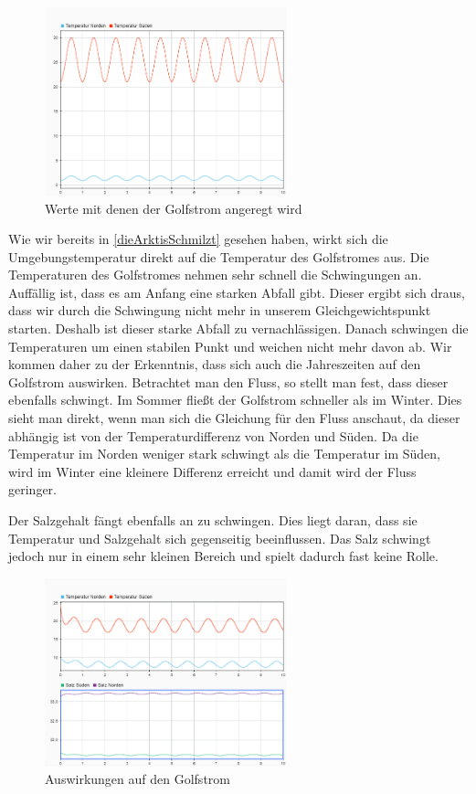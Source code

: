 \documentclass[a4paper,twoside]{article}
\begin{document}
	\begin{figure}[!h]
  		\centering
 		\includegraphics[width=7cm]{Grafiken/Jahreszeiten_init.png}
  		\caption{Werte mit denen der Golfstrom angeregt wird}
  		\label{fig:jahreszeitenUmgebung}
	\end{figure}
	
	Wie wir bereits in \ref{dieArktisSchmilzt} gesehen haben, wirkt sich die Umgebungstemperatur direkt auf die Temperatur des Golfstromes aus. Die Temperaturen des Golfstromes nehmen sehr schnell die Schwingungen an. Auffällig ist, dass es am Anfang eine starken Abfall gibt. Dieser ergibt sich draus, dass wir durch die Schwingung nicht mehr in unserem Gleichgewichtspunkt starten. Deshalb ist dieser starke Abfall zu vernachlässigen. Danach schwingen die Temperaturen um einen stabilen Punkt und weichen nicht mehr davon ab. Wir kommen daher zu der Erkenntnis, dass sich auch die Jahreszeiten auf den Golfstrom auswirken. Betrachtet man den Fluss, so stellt man fest, dass dieser ebenfalls schwingt. Im Sommer fließt der Golfstrom schneller als im Winter. Dies sieht man direkt, wenn man sich die Gleichung für den Fluss anschaut, da dieser abhängig ist von der Temperaturdifferenz von Norden und Süden. Da die Temperatur im Norden weniger stark schwingt als die Temperatur im Süden, wird im Winter eine kleinere Differenz erreicht und damit wird der Fluss geringer.
	
	Der Salzgehalt fängt ebenfalls an zu schwingen. Dies liegt daran, dass sie Temperatur und Salzgehalt sich gegenseitig beeinflussen. Das Salz schwingt jedoch nur in einem sehr kleinen Bereich und spielt dadurch fast keine Rolle.

	\begin{figure}[!h]
  		\centering
 		\includegraphics[width=7cm]{Grafiken/Jahreszeiten_werte.png}
  		\caption{Auswirkungen auf den Golfstrom}
  		\label{fig:jahreszeitenGolf}
	\end{figure}
\end{document}
